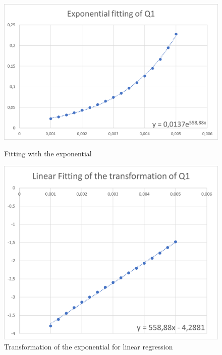 \documentclass{article}
\begin{document}
                    \begin{figure}[htbp!]
                        \centering
                        \begin{minipage}[c]{.40\textwidth}
                            \centering
                            \includegraphics[width=\textwidth]{./data_analysis/Q01_exp_delta.png}
                            \caption{Fitting with the exponential}
                            \label{fig:Q01_exp_delta}
                        \end{minipage}
                        \hspace{10mm}
                        \begin{minipage}[c]{.40\textwidth}
                            \centering
                            \includegraphics[width=\textwidth]{./data_analysis/Q01_lin_delta.png}
                            \caption{Transformation of the exponential for linear regression}
                            \label{fig:Q01_lin_delta}
                        \end{minipage}
                    \end{figure}
                    
\end{document}
